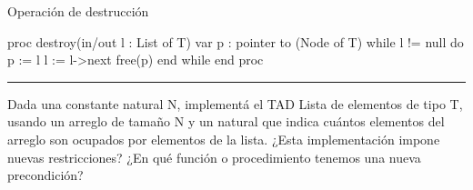 \begin{codebox}{Operación de destrucción}
\begin{pascallike}
proc destroy(in/out l : List of T)
    var p : pointer to (Node of T)
    while l != null do
        p := l
        l := l->next
        free(p)
    end while
end proc
\end{pascallike}
\end{codebox}

\begin{center}
    \rule{\textwidth}{0.4pt}
\end{center}

Dada una constante natural N, implementá el TAD Lista de elementos de tipo T, usando un arreglo de tamaño N y un natural que indica cuántos elementos del arreglo son ocupados por elementos de la lista. ¿Esta implementación impone nuevas restricciones? ¿En qué función o procedimiento tenemos una nueva precondición?


